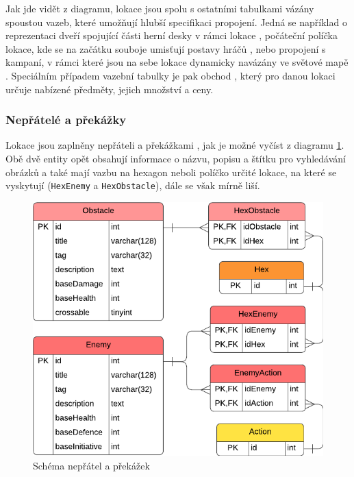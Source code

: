 Jak jde vidět z diagramu, lokace jsou spolu s ostatními tabulkami vázány spoustou vazeb, které umožňují hlubší specifikaci propojení. Jedná se například o reprezentaci dveří spojující části herní desky v rámci lokace , počáteční políčka lokace, kde se na začátku souboje umisťují postavy hráčů , nebo propojení s kampaní, v rámci které jsou na sebe lokace dynamicky navázány ve světové mapě . Speciálním případem vazební tabulky je pak obchod , který pro danou lokaci určuje nabízené předměty, jejich množství a ceny.

\subsubsection*{Nepřátelé a překážky}
\label{subsubsec:schema_enemy_obstacle}

Lokace jsou zaplněny nepřáteli  a překážkami , jak je možné vyčíst z diagramu \ref{diag:er_enemy_obstacle}. Obě dvě entity opět obsahují informace o názvu, popisu a štítku pro vyhledávání obrázků a také mají vazbu na hexagon neboli políčko určité lokace, na které se vyskytují (\texttt{HexEnemy} a \texttt{HexObstacle}), dále se však mírně liší.

\begin{figure}[h]
    \centering
    \includegraphics{../../shared/diagrams/er_enemy_obstacle.pdf}
    \caption{Schéma nepřátel a překážek}
    \label{diag:er_enemy_obstacle}
\end{figure}

